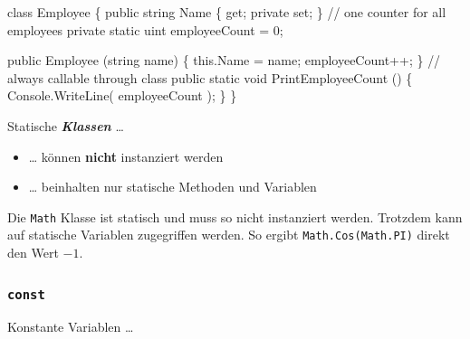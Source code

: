 \documentclass[
  9pt,
  a4paperpaper,
  DIV=11]{scrartcl}
\newenvironment{Shaded}{}{}
\newcommand{\CommentTok}[1]{\textcolor[rgb]{0.42,0.45,0.49}{#1}}
\newcommand{\DataTypeTok}[1]{\textcolor[rgb]{0.84,0.23,0.29}{#1}}
\newcommand{\DecValTok}[1]{\textcolor[rgb]{0.00,0.36,0.77}{#1}}
\newcommand{\FunctionTok}[1]{\textcolor[rgb]{0.44,0.26,0.76}{#1}}
\newcommand{\KeywordTok}[1]{\textcolor[rgb]{0.84,0.23,0.29}{#1}}
\newcommand{\NormalTok}[1]{\textcolor[rgb]{0.14,0.16,0.18}{#1}}
\newcommand{\OperatorTok}[1]{\textcolor[rgb]{0.14,0.16,0.18}{#1}}
\providecommand{\tightlist}{%
  \setlength{\itemsep}{0pt}\setlength{\parskip}{0pt}}\usepackage{longtable,booktabs,array}
\numberwithin{equation}{section}
\begin{document}
\begin{multicols}{2}
\begin{Shaded}
\begin{Highlighting}[]
\KeywordTok{class}\NormalTok{ Employee }\OperatorTok{\{}
  \KeywordTok{public} \DataTypeTok{string}\NormalTok{ Name }\OperatorTok{\{} \KeywordTok{get}\OperatorTok{;} \KeywordTok{private} \KeywordTok{set}\OperatorTok{;} \OperatorTok{\}}
  \CommentTok{// one counter for all employees}
  \KeywordTok{private} \KeywordTok{static} \DataTypeTok{uint}\NormalTok{ employeeCount }\OperatorTok{=} \DecValTok{0}\OperatorTok{;}

  \KeywordTok{public} \FunctionTok{Employee} \OperatorTok{(}\DataTypeTok{string}\NormalTok{ name}\OperatorTok{)} \OperatorTok{\{}
    \KeywordTok{this}\OperatorTok{.}\FunctionTok{Name} \OperatorTok{=}\NormalTok{ name}\OperatorTok{;}
\NormalTok{    employeeCount}\OperatorTok{++;}
  \OperatorTok{\}}
  \CommentTok{// always callable through class}
  \KeywordTok{public} \KeywordTok{static} \DataTypeTok{void} \FunctionTok{PrintEmployeeCount} \OperatorTok{()} \OperatorTok{\{}
\NormalTok{    Console}\OperatorTok{.}\FunctionTok{WriteLine}\OperatorTok{(}\NormalTok{ employeeCount }\OperatorTok{);}
  \OperatorTok{\}}
\OperatorTok{\}}
\end{Highlighting}
\end{Shaded}

Statische \textbf{\emph{Klassen}} \ldots{}

\begin{itemize}
\tightlist
\item
  \ldots{} können \textbf{nicht} instanziert werden
\item
  \ldots{} beinhalten nur statische Methoden und Variablen
\end{itemize}

Die \texttt{Math} Klasse ist statisch und muss so nicht instanziert
werden. Trotzdem kann auf statische Variablen zugegriffen werden. So
ergibt \texttt{Math.Cos(Math.PI)} direkt den Wert \(-1\).

\hypertarget{const}{%
\subsubsection{\texorpdfstring{\texttt{const}}{const}}\label{const}}

Konstante Variablen \ldots{}


\end{multicols}
\end{document}
